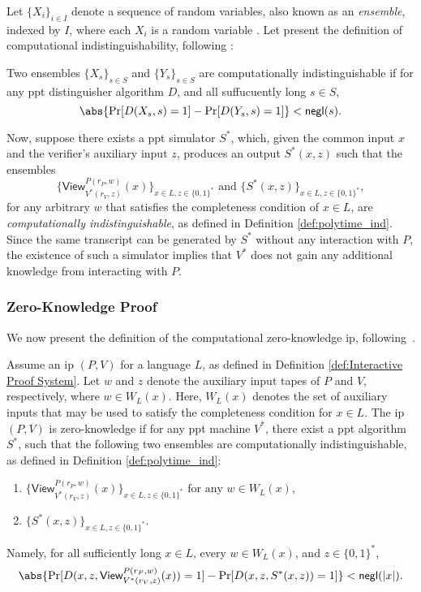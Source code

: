 Let $\{X_i\}_{i \in I}$ denote a sequence of random variables, also known as an \textit{ensemble}, indexed by $I$, where each $X_i$ is a random variable \cite{Goldreich2001Book}.  Let present the definition of computational indistinguishability, following \cite[Definition 3.2.2]{Goldreich2001Book}:
\begin{definition}\label{def:polytime_ind}	
	Two ensembles $\{X_s\}_{s\in S}$ and $\{Y_s\}_{s\in S}$ are  computationally indistinguishable if for any \gls{ppt} distinguisher algorithm $D$, and all suffucuently long $s \in S$,
	\[
	\abs{\Pr[D(X_s, s) = 1] - \Pr[D(Y_s, s) = 1]} < \mathsf{negl}(s).
	\]
\end{definition}



Now, suppose there exists a \gls{ppt} simulator $S^*$, which, given the common input $x$ and the verifier's auxiliary input $z$, produces an output $S^*(x, z)$ such that the ensembles  
\[
\{\textsf{View}_{V^*(r_V, z)}^{P(r_P, w)}(x)\}_{x\in L, z \in \{0,1\}^*} \text{ and } \{S^*(x, z)\}_{x\in L, z \in \{0,1\}^*},
\]  
for any arbitrary $w$ that satisfies the completeness condition of $x\in L$, are \textit{computationally indistinguishable}, as defined in Definition \ref{def:polytime_ind}. Since the same transcript can be generated by $S^*$ without any interaction with $P$, the existence of such a simulator implies that $V^*$ does not gain any additional knowledge from interacting with $P$.


\subsubsection{Zero-Knowledge Proof}\label{sec:prel_zero_knowledge_property}
We now present the definition of the computational zero-knowledge \gls{ip}, following~\cite[Definition 4.3.10]{Goldreich2001Book}.

\begin{definition}\label{def:zk-proerty}	Assume an \gls{ip} $(P, V)$ for a language $L$, as defined in Definition \ref{def:Interactive Proof System}. Let $w$ and $z$ denote the auxiliary input tapes of $P$ and $V$, respectively, where $w \in W_L(x)$. Here, $W_L(x)$ denotes the set of auxiliary inputs that may be used to satisfy the completeness condition for $x \in L$.  The \gls{ip} $(P, V)$  is zero-knowledge if for any \gls{ppt} machine $V^*$, there exist a  \gls{ppt} algorithm $S^*$, such that the following  two ensembles are computationally indistinguishable, as defined in Definition \ref{def:polytime_ind}:
\begin{enumerate}
	\item $\{\textsf{View}_{V^*(r_V, z)}^{P(r_P, w)}(x)\}_{x\in L, z \in \{0,1\}^*} \text{ for any } w \in  W_L(x)$,
	\item $\{S^*(x, z)\}_{x\in L, z \in \{0,1\}^*}$.
\end{enumerate}
Namely, for all sufficiently long $x \in L$, every $w \in  W_L(x)$, and $z \in \{0,1\}^*$,
\[
	\abs{\Pr[D(x, z, \textsf{View}_{V^*(r_V, z)}^{P(r_P, w)}(x)) = 1] - \Pr[D(x, z, S^*(x, z)) = 1]} < \mathsf{negl}(|x|).
\]
\end{definition}


